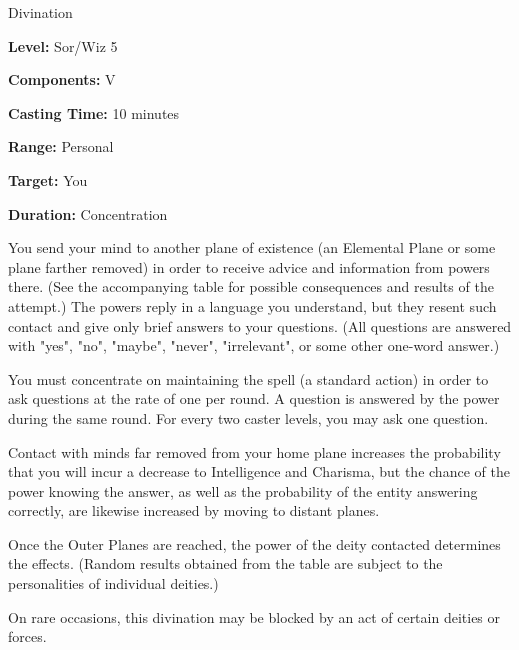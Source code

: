 
Divination

\textbf{Level:} Sor/Wiz 5

\textbf{Components:} V

\textbf{Casting Time:} 10 minutes

\textbf{Range:} Personal

\textbf{Target:} You

\textbf{Duration:} Concentration

You send your mind to another plane of existence (an Elemental Plane or some plane 
farther removed) in order to receive advice and information from powers there. 
(See the accompanying table for possible consequences and results of the attempt.) 
The powers reply in a language you understand, but they resent such contact and 
give only brief answers to your questions. (All questions are answered with "yes", 
"no", "maybe", "never", "irrelevant", or some other one-word answer.)

You must concentrate on maintaining the spell (a standard action) in order to ask 
questions at the rate of one per round. A question is answered by the power during 
the same round. For every two caster levels, you may ask one question.

Contact with minds far removed from your home plane increases the probability that 
you will incur a decrease to Intelligence and Charisma, but the chance of the power 
knowing the answer, as well as the probability of the entity answering correctly, 
are likewise increased by moving to distant planes.

Once the Outer Planes are reached, the power of the deity contacted determines 
the effects. (Random results obtained from the table are subject to the personalities 
of individual deities.)

On rare occasions, this divination may be blocked by an act of certain deities 
or forces.

